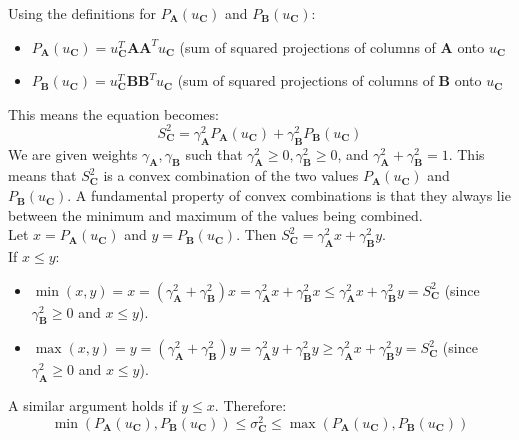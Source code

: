 Using the definitions for $P_{\mathbf{A}}(u_{\mathbf{C}})$ and $P_{\mathbf{B}}(u_{\mathbf{C}})$:
\begin{itemize}
    \item $P_{\mathbf{A}}(u_{\mathbf{C}}) = u_{\mathbf{C}}^T\mathbf{A}\mathbf{A}^Tu_{\mathbf{C}}$ (sum of squared projections of columns of $\mathbf{A}$ onto $u_{\mathbf{C}}$
    \item $P_{\mathbf{B}}(u_{\mathbf{C}}) = u_{\mathbf{C}}^T\mathbf{B}\mathbf{B}^Tu_{\mathbf{C}}$ (sum of squared projections of columns of $\mathbf{B}$ onto $u_{\mathbf{C}}$
\end{itemize}
This means the equation becomes:
\[ S_{\mathbf{C}}^2 = \gamma_{\mathbf{A}}^2P_{\mathbf{A}}(u_{\mathbf{C}}) + \gamma_{\mathbf{B}}^2P_{\mathbf{B}}(u_{\mathbf{C}}) \]
We are given weights $\gamma_{\mathbf{A}}, \gamma_{\mathbf{B}}$ such that $\gamma_{\mathbf{A}}^2 \geq 0,
\gamma_{\mathbf{B}}^2 \geq 0$, and $\gamma_{\mathbf{A}}^2 + \gamma_{\mathbf{B}}^2 = 1$. This means that
$S_{\mathbf{C}}^2$ is a convex combination of the two values $P_{\mathbf{A}}(u_{\mathbf{C}})$ and
$P_{\mathbf{B}}(u_{\mathbf{C}})$.
A fundamental property of convex combinations is that they always lie between
the minimum and maximum of the values being combined.\\
Let $x = P_{\mathbf{A}}(u_{\mathbf{C}})$ and $y = P_{\mathbf{B}}(u_{\mathbf{C}})$. Then $S_{\mathbf{C}}^2 = \gamma_{\mathbf{A}}^2 x +
\gamma_{\mathbf{B}}^2 y$.\\
If $x \leq y$:
\begin{itemize}
    \item $\min(x,y) = x = (\gamma_{\mathbf{A}}^2 + \gamma_{\mathbf{B}}^2)x = \gamma_{\mathbf{A}}^2 x +
        \gamma_{\mathbf{B}}^2 x \leq \gamma_{\mathbf{A}}^2 x + \gamma_{\mathbf{B}}^2 y = S_{\mathbf{C}}^2$ (since
        $\gamma_{\mathbf{B}}^2 \geq 0$ and $x \leq y$).
    \item $\max(x,y) = y = (\gamma_{\mathbf{A}}^2 + \gamma_{\mathbf{B}}^2)y = \gamma_{\mathbf{A}}^2 y +
        \gamma_{\mathbf{B}}^2 y \geq \gamma_{\mathbf{A}}^2 x + \gamma_{\mathbf{B}}^2 y = S_{\mathbf{C}}^2$ (since
        $\gamma_{\mathbf{A}}^2 \geq 0$ and $x \leq y$).
\end{itemize}
A similar argument holds if $y \leq x$. Therefore:
\[ \min(P_{\mathbf{A}}(u_{\mathbf{\mathbf{C}}}),P_{\mathbf{\mathbf{B}}}(u_{\mathbf{\mathbf{C}}})) \leq \sigma_{\mathbf{\mathbf{C}}}^2 \leq
\max(P_{\mathbf{A}}(u_{\mathbf{\mathbf{C}}}),P_{\mathbf{\mathbf{B}}}(u_{\mathbf{\mathbf{C}}})) \]
